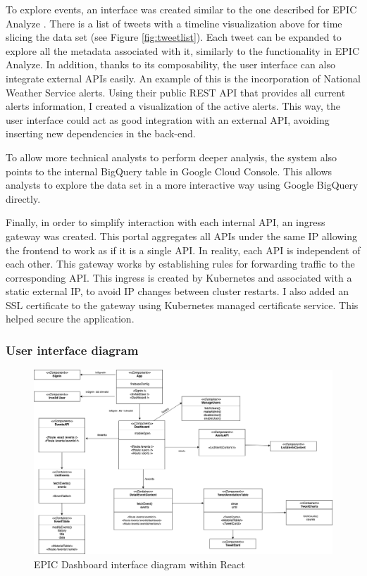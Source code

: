 To explore events, an interface was created similar to the one described for EPIC Analyze \cite{barrenechea2015getting}. There is a list of tweets with a timeline visualization above for time slicing the data set (see Figure \ref{fig:tweetlist}). Each tweet can be expanded to explore all the metadata associated with it, similarly to the functionality in EPIC Analyze. In addition, thanks to its composability, the user interface can also integrate external APIs easily. An example of this is the incorporation of  National Weather Service alerts. Using their public REST API that provides all current alerts information, I created a visualization of the active alerts. This way, the user interface could act as good integration with an external API, avoiding inserting new dependencies in the back-end.

To allow more technical analysts to perform deeper analysis, the system also points to the internal BigQuery table in Google Cloud Console. This allows analysts to explore the data set in a more interactive way using Google BigQuery directly.

Finally, in order to simplify interaction with each internal API, an ingress gateway was created. This portal aggregates all APIs under the same IP allowing the frontend to work as if it is a single API. In reality, each API is independent of each other. This gateway works by establishing rules for forwarding traffic to the corresponding API. This ingress is created by Kubernetes and associated with a static external IP, to avoid IP changes between cluster restarts. I also added an SSL certificate to the gateway using Kubernetes managed certificate service. This helped secure the application. 

\subsubsection{User interface diagram}

\begin{figure}[htbp]
	\caption{\label{fig:frontdiag}
	EPIC Dashboard interface diagram within React
	}
    \begin{center}
	\includegraphics[width=150mm]{figs/front_diagram.png}
    \end{center}
\label{xfigDiagram}
\end{figure}



